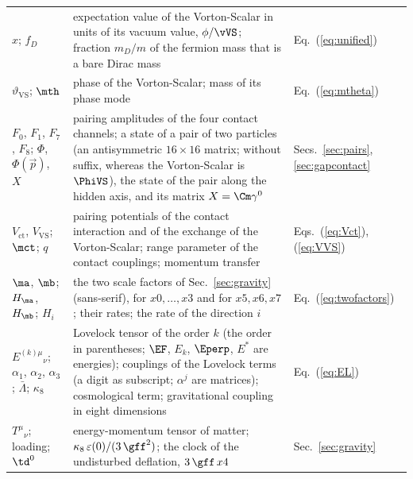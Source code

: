 \begin{table}
\begin{ruledtabular}
\begin{tabular}{p{}p{}p{}}
$x$; $f_D$ & expectation value of the Vorton-Scalar in units of its vacuum value, $\phi/\vVS$; fraction $m_D/m$ of the fermion mass that is a bare Dirac mass & Eq.~(\ref{eq:unified}) \\
$\vartheta_{\mathrm{VS}}$; $\mth$ & phase of the Vorton-Scalar; mass of its phase mode & Eq.~(\ref{eq:mtheta}) \\
$F_0$, $F_1$, $F_7$, $F_8$; $\Phi$, $\Phi(\vec p)$, $X$ & pairing amplitudes of the four contact channels; a state of a pair of two particles (an antisymmetric $16\times16$ matrix; without suffix, whereas the Vorton-Scalar is $\PhiVS$), the state of the pair along the hidden axis, and its matrix $X=\Cm\gamma^{0}$ & Secs.~\ref{sec:pairs}, \ref{sec:gapcontact} \\
$V_{\mathrm{ct}}$, $V_{\mathrm{VS}}$; $\mct$; $q$ & pairing potentials of the contact interaction and of the exchange of the Vorton-Scalar; range parameter of the contact couplings; momentum transfer & Eqs.~(\ref{eq:Vct}), (\ref{eq:VVS}) \\
$\ma$, $\mb$; $H_{\ma}$, $H_{\mb}$; $H_i$ & the two scale factors of Sec.~\ref{sec:gravity} (sans-serif), for $x0,\dots,x3$ and for $x5,x6,x7$; their rates; the rate of the direction $i$ & Eq.~(\ref{eq:twofactors}) \\
$E^{(k)\mu}{}_{\nu}$; $\alpha_1$, $\alpha_2$, $\alpha_3$; $\bar\Lambda$; $\kappa_8$ & Lovelock tensor of the order $k$ (the order in parentheses; $\EF$, $E_k$, $\Eperp$, $E^{*}$ are energies); couplings of the Lovelock terms (a digit as subscript; $\alpha^{j}$ are matrices); cosmological term; gravitational coupling in eight dimensions & Eq.~(\ref{eq:EL}) \\
$T^{\mu}{}_{\nu}$; loading; $\td^{0}$ & energy-momentum tensor of matter; $\kappa_8\,\varepsilon(0)/(3\,\gff^{2})$; the clock of the undisturbed deflation, $3\,\gff\,x4$ & Sec.~\ref{sec:gravity} \\
\end{tabular}
\end{ruledtabular}
\end{table}

